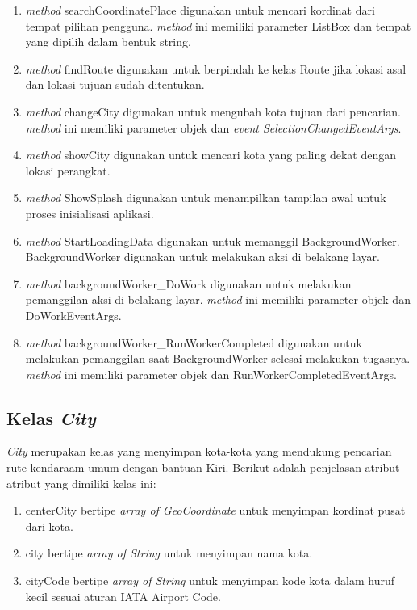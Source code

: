 \begin{enumerate}
	\item \textit{method} searchCoordinatePlace digunakan untuk mencari kordinat dari tempat pilihan pengguna. \textit{method} ini memiliki parameter ListBox dan tempat yang dipilih dalam bentuk string.
	\item \textit{method} findRoute digunakan untuk berpindah ke kelas Route jika lokasi asal dan lokasi tujuan sudah ditentukan.
	\item \textit{method} changeCity digunakan untuk mengubah kota tujuan dari pencarian. \textit{method} ini memiliki parameter objek dan \textit{event SelectionChangedEventArgs}.
	\item \textit{method} showCity digunakan untuk mencari kota yang paling dekat dengan lokasi perangkat.
	\item \textit{method} ShowSplash digunakan untuk menampilkan tampilan awal untuk proses inisialisasi aplikasi.
	\item \textit{method} StartLoadingData digunakan untuk memanggil BackgroundWorker. BackgroundWorker digunakan untuk melakukan aksi di belakang layar.
	\item \textit{method} backgroundWorker\_DoWork digunakan untuk melakukan pemanggilan aksi di belakang layar. \textit{method} ini memiliki parameter objek dan DoWorkEventArgs.
	\item \textit{method} backgroundWorker\_RunWorkerCompleted digunakan untuk melakukan pemanggilan saat BackgroundWorker selesai melakukan tugasnya. \textit{method} ini memiliki parameter objek dan RunWorkerCompletedEventArgs.
\end{enumerate}

\subsection{Kelas \textit{City}}
\label{lab:Kelas City}
\hspace{0.5cm} \textit{City} merupakan kelas yang menyimpan kota-kota yang mendukung pencarian rute kendaraam umum dengan bantuan Kiri. Berikut adalah penjelasan atribut-atribut yang dimiliki kelas ini:
\begin{enumerate}
	\item centerCity bertipe \textit{array of GeoCoordinate} untuk menyimpan kordinat pusat dari kota.
	\item city bertipe \textit{array of String} untuk menyimpan nama kota.
	\item cityCode bertipe \textit{array of String} untuk menyimpan kode kota dalam huruf kecil sesuai aturan IATA Airport Code. 
\end{enumerate}

